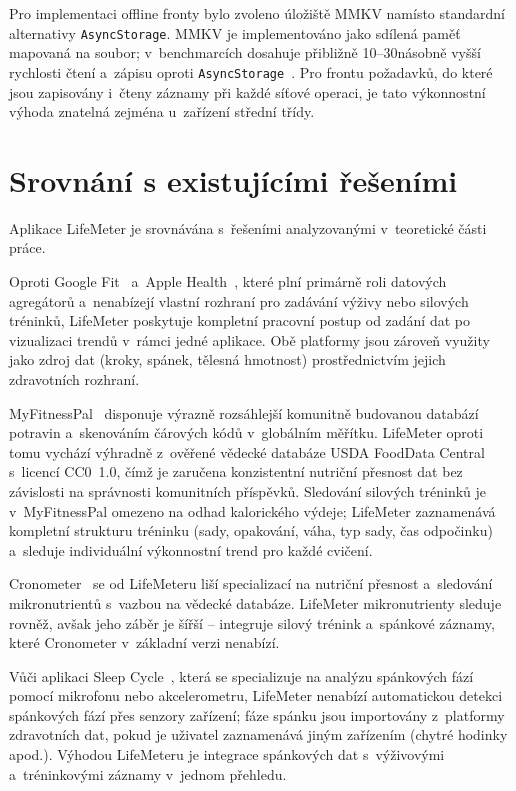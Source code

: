 Pro implementaci offline fronty bylo zvoleno úložiště MMKV namísto
standardní alternativy \texttt{AsyncStorage}. MMKV je implementováno
jako sdílená paměť mapovaná na soubor; v~benchmarcích dosahuje
přibližně 10--30násobně vyšší rychlosti čtení a~zápisu oproti
\texttt{AsyncStorage}~\cite{mmkv2024}. Pro frontu požadavků, do které
jsou zapisovány i~čteny záznamy při každé síťové operaci, je tato
výkonnostní výhoda znatelná zejména u~zařízení střední třídy.

\section{Srovnání s existujícími řešeními}

Aplikace LifeMeter je srovnávána s~řešeními analyzovanými v~teoretické
části práce.

Oproti Google Fit~\cite{googlefit2024} a~Apple Health~\cite{applehealth2024},
které plní primárně roli datových agregátorů a~nenabízejí vlastní rozhraní
pro zadávání výživy nebo silových tréninků, LifeMeter poskytuje kompletní
pracovní postup od zadání dat po vizualizaci trendů v~rámci jedné aplikace.
Obě platformy jsou zároveň využity jako zdroj dat (kroky, spánek, tělesná
hmotnost) prostřednictvím jejich zdravotních rozhraní.

MyFitnessPal~\cite{myfitnesspal2024} disponuje výrazně rozsáhlejší
komunitně budovanou databází potravin a~skenováním čárových kódů v~globálním
měřítku. LifeMeter oproti tomu vychází výhradně z~ověřené vědecké databáze
USDA FoodData Central~\cite{usda2024} s~licencí CC0~1.0, čímž je zaručena
konzistentní nutriční přesnost dat bez závislosti na správnosti komunitních
příspěvků. Sledování silových tréninků je v~MyFitnessPal omezeno na odhad
kalorického výdeje; LifeMeter zaznamenává kompletní strukturu tréninku
(sady, opakování, váha, typ sady, čas odpočinku) a~sleduje individuální
výkonnostní trend pro každé cvičení.

Cronometer~\cite{cronometer2024} se od LifeMeteru liší specializací na
nutriční přesnost a~sledování mikronutrientů s~vazbou na vědecké databáze.
LifeMeter mikronutrienty sleduje rovněž, avšak jeho záběr je šířší --
integruje silový trénink a~spánkové záznamy, které Cronometer v~základní
verzi nenabízí.

Vůči aplikaci Sleep Cycle~\cite{sleepcycle2024}, která se specializuje na
analýzu spánkových fází pomocí mikrofonu nebo akcelerometru, LifeMeter
nenabízí automatickou detekci spánkových fází přes senzory zařízení;
fáze spánku jsou importovány z~platformy zdravotních dat, pokud je uživatel
zaznamenává jiným zařízením (chytré hodinky apod.). Výhodou LifeMeteru je
integrace spánkových dat s~výživovými a~tréninkovými záznamy v~jednom
přehledu.

